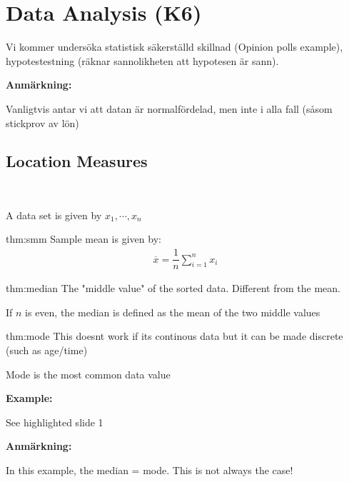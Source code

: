 \section{Data Analysis (K6)}\par
\noindent Vi kommer undersöka statistisk säkerställd skillnad (Opinion polls example), hypotestestning (räknar sannolikheten att hypotesen är sann).
\par\bigskip
\noindent\textbf{Anmärkning:}\par
\noindent Vanligtvis antar vi att datan är normalfördelad, men inte i alla fall (såsom stickprov av lön)
\par\bigskip
\subsection{Location Measures}\hfill\\\par
\noindent A data set is given by $x_1,\cdots,x_n$
\par\bigskip
\begin{theo}{thm:smm}
  Sample mean is given by:
  \begin{equation*}
    \begin{gathered}
      \overline{x} = \dfrac{1}{n}\sum_{i=1}^{n}x_i
    \end{gathered}
  \end{equation*}
\end{theo}
\par\bigskip
\begin{theo}[Median]{thm:median}
  The "middle value" of the sorted data. Different from the mean.\par
  \noindent If $n$ is even, the median is defined as the mean of the two middle values
\end{theo}
\par\bigskip
\begin{theo}[Mode]{thm:mode}
  This doesnt work if its continous data but it can be made discrete (such as age/time)\par
  \noindent Mode is the most common data value
\end{theo}
\par\bigskip
\noindent\textbf{Example:}\par
\noindent See highlighted slide 1
\par\bigskip
\noindent\textbf{Anmärkning:}\par
\noindent In this example, the median = mode. This is not always the case!
\par\bigskip
